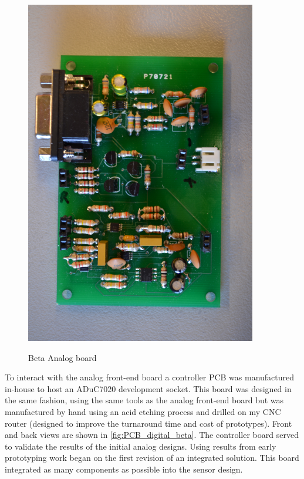 \begin{figure}
	\begin{center}
		\label{fig:PCB_analog_beta}
		\includegraphics[scale=1,width=0.9\textwidth]{Images/PCB_AnalogBeta.JPG} 
		\caption{Beta Analog board}
	\end{center}
\end{figure}

To interact with the analog front-end board a controller PCB was manufactured in-house to host an ADuC7020 development socket. This board was designed in the same fashion, using the same tools as the analog front-end board but was manufactured by hand using an acid etching process and drilled on my CNC router (designed to improve the turnaround time and cost of prototypes). Front and back views are shown in \cref{fig:PCB_digital_beta}. The controller board served to validate the results of the initial analog designs. Using results from early prototyping work began on the first revision of an integrated solution. This board integrated as many components as possible into the sensor design.

